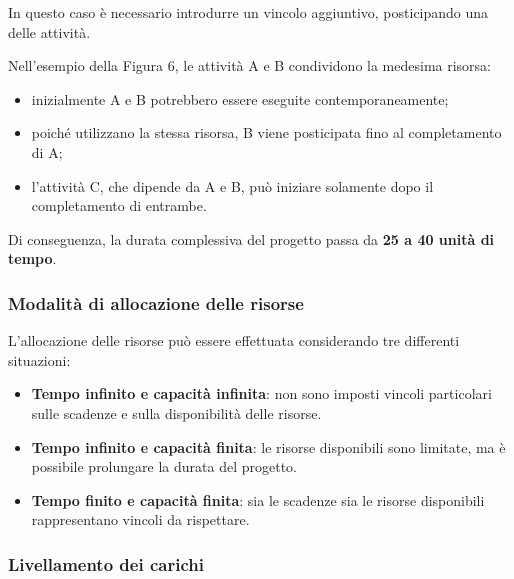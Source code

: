 \medskip

\noindent In questo caso è necessario introdurre
un vincolo aggiuntivo, posticipando una delle attività.

\medskip

\noindent Nell'esempio della Figura 6, le attività A e B
condividono la medesima risorsa:

\begin{itemize}
    \item inizialmente A e B potrebbero essere eseguite
    contemporaneamente;

    \item poiché utilizzano la stessa risorsa, B viene
    posticipata fino al completamento di A;

    \item l'attività C, che dipende da A e B,
    può iniziare solamente dopo il completamento
    di entrambe.
\end{itemize}

\noindent Di conseguenza, la durata complessiva
del progetto passa da \textbf{25 a 40 unità di tempo}.

\medskip

\subsubsection*{Modalità di allocazione delle risorse}

\noindent L'allocazione delle risorse può essere effettuata
considerando tre differenti situazioni:

\begin{itemize}
    \item \textbf{Tempo infinito e capacità infinita}:
    non sono imposti vincoli particolari sulle scadenze
    e sulla disponibilità delle risorse.

    \item \textbf{Tempo infinito e capacità finita}:
    le risorse disponibili sono limitate, ma è possibile
    prolungare la durata del progetto.

    \item \textbf{Tempo finito e capacità finita}:
    sia le scadenze sia le risorse disponibili
    rappresentano vincoli da rispettare.
\end{itemize}

\subsubsection*{Livellamento dei carichi}

